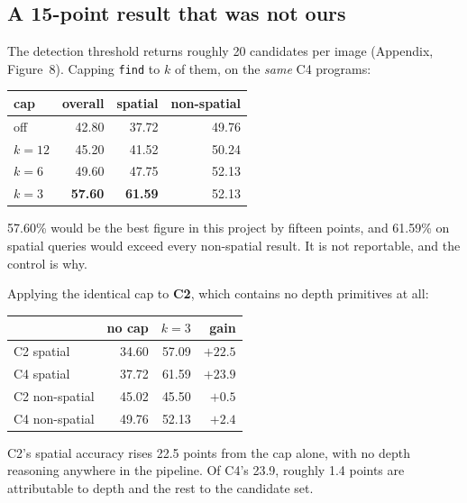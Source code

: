 \documentclass[11pt,a4paper]{article}
\newcommand{\down}[1]{\textcolor{bad}{\textbf{#1}}}
\begin{document}
\subsection{A 15-point result that was not ours}

The detection threshold returns roughly 20 candidates per image (Appendix,
Figure~8). Capping \texttt{find} to $k$ of them, on the \emph{same} C4 programs:

\begin{center}\small
\begin{tabular}{@{}lrrr@{}}
\toprule
\textbf{cap} & \textbf{overall} & \textbf{spatial} & \textbf{non-spatial} \\
\midrule
off & 42.80 & 37.72 & 49.76 \\
$k=12$ & 45.20 & 41.52 & 50.24 \\
$k=6$ & 49.60 & 47.75 & 52.13 \\
$k=3$ & \textbf{57.60} & \textbf{61.59} & 52.13 \\
\bottomrule
\end{tabular}
\end{center}

\vspace{3pt}
57.60\% would be the best figure in this project by fifteen points, and 61.59\% on
spatial queries would exceed every non-spatial result. It is not reportable, and the
control is why.

Applying the identical cap to \textbf{C2}, which contains no depth primitives at all:

\begin{center}\small
\begin{tabular}{@{}lrrr@{}}
\toprule
 & \textbf{no cap} & \textbf{$k=3$} & \textbf{gain} \\
\midrule
C2 spatial & 34.60 & 57.09 & \down{$+22.5$} \\
C4 spatial & 37.72 & 61.59 & $+23.9$ \\
C2 non-spatial & 45.02 & 45.50 & $+0.5$ \\
C4 non-spatial & 49.76 & 52.13 & $+2.4$ \\
\bottomrule
\end{tabular}
\end{center}

\vspace{3pt}
C2's spatial accuracy rises 22.5 points from the cap alone, with no depth reasoning
anywhere in the pipeline. Of C4's 23.9, roughly 1.4 points are attributable to depth
and the rest to the candidate set.
\end{document}
